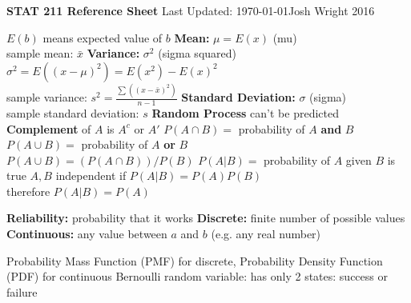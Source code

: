 \documentclass{article}
\renewcommand\labelitemi{\tiny$\bullet$}
\renewcommand\labelitemii{\labelitemi}
\newcommand{\remove}[1]{#1}
\begin{document}
\allowdisplaybreaks
\large
\noindent
\textbf{STAT 211 Reference Sheet} \hfill Last Updated: \today \hfill \textcopyright \space Josh Wright 2016
\begin{multicols*}{2}
\begin{outline}[compactitem]
\noindent


\newcommand{\upspace}{\vspace{0px}\linespread{0}}
\newcommand{\zzz}[1]{\noindent\0\noindent {\textbf{#1:}}}
\renewcommand\labelitemii{\labelitemi}
\let\oldOne\1\let\oldTwo\2\let\oldThree\3\let\oldFour\4
\renewcommand{\1}{\upspace \oldOne  }
\renewcommand{\2}{\upspace \oldTwo  }
\renewcommand{\3}{\upspace \oldThree}
\renewcommand{\4}{\upspace \oldFour }






\zzz{General}
  \1 $E(b)$ means expected value of $b$
  \1\textbf{Mean:} $\mu = E(x)$ (mu)
  \\ sample mean: $\bar x$
  \1\textbf{Variance:} $\sigma^2$ (sigma squared)
  \\ $\sigma^2 = E( (x-\mu)^2 ) = E(x^2) - E(x)^2$
  \\ sample variance: $s^2 = \frac{\sum((x-\bar x)^2)}{n-1}$
  \1\textbf{Standard Deviation:} $\sigma$ (sigma)
  \\ sample standard deviation: $s$
  \1 \textbf{Random Process} can't be predicted
  \1 \textbf{Complement} of $A$ is $A^c$ or $A'$
  \1 $P(A\cap B)=$ probability of $A$ \textbf{and} $B$
  \1 $P(A\cup B)=$ probability of $A$ \textbf{or} $B$
  \\ $P(A\cup B) = (P(A\cap B))/P(B)$
  \1 $P(A|B) = $ probability of $A$ given $B$ is true
  \1 $A,B$ independent if $P(A|B)=P(A)P(B)$
  \\ therefore $P(A|B) = P(A)$
  \remove{
  \1 \textbf{Reliability:} probability that it works
  \1 \textbf{Discrete:} finite number of possible values
  \\ \textbf{Continuous:} any value between $a$ and $b$ (e.g. any real number)
  }
  \1 Probability Mass Function (PMF) for discrete, Probability Density Function (PDF) for continuous
  \1 Bernoulli random variable: has only 2 states: success or failure


\end{outline}
\end{multicols*}
\end{document}
